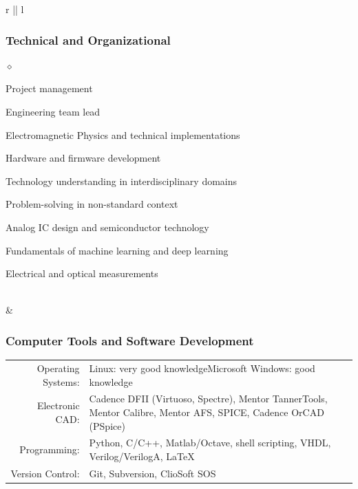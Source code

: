 \documentclass[a4paper]{article}
\newlength{\sectsep}
\newlength{\subsectsep}
\renewenvironment{itemize}{
  \begin{list}{$\diamond$}{
    \setlength{\topsep}{0.1em}
    \setlength{\itemsep}{0em}
    \setlength{\parskip}{0pt}
    \setlength{\parsep}{0em}
  }
}{
  \end{list}
}
\begin{document}
\begin{longtable}{r || l}
\begin{minipage}{0.9\textwidth}
      \subsubsection*{Technical and Organizational}
      \begin{itemize}
          \item Project management
          \item Engineering team lead
          \item Electromagnetic Physics and technical implementations
          \item Hardware and firmware development
          \item Technology understanding in interdisciplinary domains
          \item Problem-solving in non-standard context
          \item Analog IC design and semiconductor technology
          \item Fundamentals of machine learning and deep learning
          \item Electrical and optical measurements
      \end{itemize}
  \end{minipage} \\[\sectsep]

  & \begin{minipage}{0.9\textwidth}
      \vspace{\subsectsep}
      \subsubsection*{Computer Tools and Software Development}
      \begin{tabular*}{\textwidth}{r p{}}
        Operating Systems:&{Linux: very good knowledge\newline Microsoft Windows: good knowledge}\vspace{0.5ex}\\[0.5ex]
        Electronic CAD:&Cadence DFII (Virtuoso, Spectre), Mentor TannerTools, Mentor Calibre, Mentor AFS, SPICE, Cadence OrCAD (PSpice)\vspace{0.5ex}\\[0.5ex]
        Programming:&Python, C/C++, Matlab/Octave, shell scripting, VHDL, Verilog/VerilogA, {\fontfamily{arial}\selectfont\LaTeX}\vspace{0.5ex}\\[0.5ex]
        Version Control:&Git, Subversion, ClioSoft SOS
      \end{tabular*}\\
  \end{minipage} \\[\sectsep]


\end{longtable}
\end{document}
